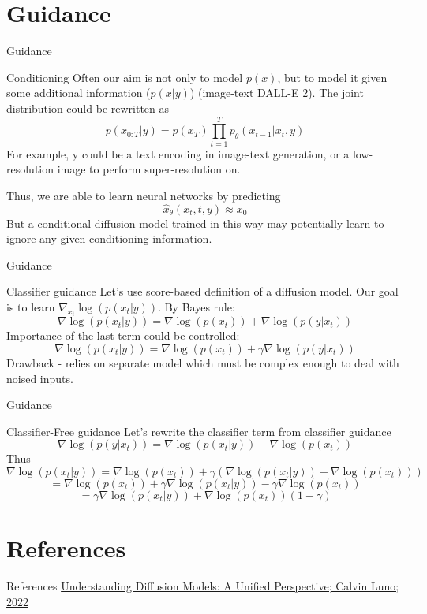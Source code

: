 \documentclass{beamer}
\begin{document}
\section{Guidance}
\begin{frame}{Guidance}
\begin{block}{Conditioning}
Often our aim is not only to model $p(x)$, but to model it given some additional information ($p(x|y)$) (image-text DALL-E 2). The joint distribution could be rewritten as
\[p(x_{0:T}|y) = p(x_T) \prod_{t=1}^Tp_{\theta}(x_{t-1}|x_t, y)\]
For example, y could be a text encoding in image-text generation, or a low-resolution image to perform super-resolution on.

Thus, we are able to learn neural networks by predicting
\[\widehat{x}_\theta(x_t, t, y) \approx x_0\]
But a conditional diffusion model trained in this way may potentially learn to ignore any given conditioning information.
\end{block}
\end{frame}


\begin{frame}{Guidance}
\begin{block}{Classifier guidance}
Let's use score-based definition of a diffusion model. Our goal is to learn $\nabla_{x_t}{\log(p(x_t|y))}$. By Bayes rule:
\[\nabla{\log(p(x_t|y))} = \nabla{\log(p(x_t))} + \nabla{\log(p(y|x_t))}\]
Importance of the last term could be controlled:
\[\nabla{\log(p(x_t|y))} = \nabla{\log(p(x_t))} + \gamma\nabla{\log(p(y|x_t))}\]
Drawback - relies on separate model which must be complex enough to deal with noised inputs.
\end{block}
\end{frame}

\begin{frame}{Guidance}
\begin{block}{Classifier-Free guidance}
Let's rewrite the classifier term from classifier guidance
\[\nabla{\log(p(y|x_t))} = \nabla{\log(p(x_t|y))} - \nabla{\log(p(x_t))}\]
Thus
\[\nabla{\log(p(x_t|y))} = \nabla{\log(p(x_t))} + \gamma(\nabla{\log(p(x_t|y))} - \nabla{\log(p(x_t))})\]
\[=\nabla{\log(p(x_t))} + \gamma\nabla{\log(p(x_t|y))} - \gamma\nabla{\log(p(x_t))}\]
\[=\gamma\nabla{\log(p(x_t|y))} + \nabla{\log(p(x_t))}(1 - \gamma)\]
\end{block}
\end{frame}

\section{References}
\begin{frame}{References}
\href{https://arxiv.org/pdf/2208.11970.pdf}{Understanding Diffusion Models: A Unified Perspective; Calvin Luno; 2022}
\end{frame}
\end{document}
